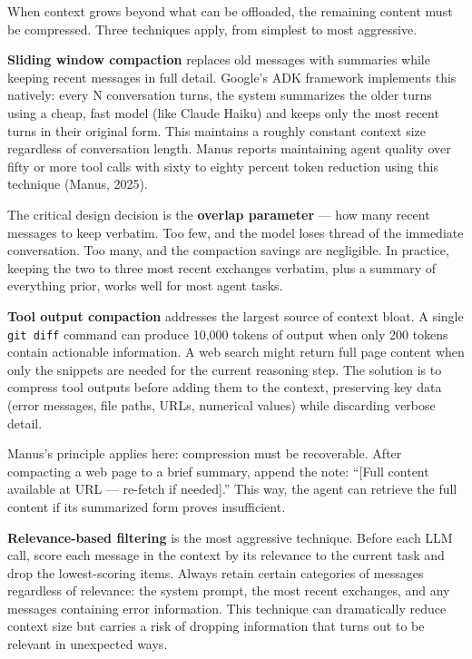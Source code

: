 \documentclass[11pt, a4paper]{article}
\newcommand{\passthrough}[1]{#1}
\begin{document}
When context grows beyond what can be offloaded, the remaining content
must be compressed. Three techniques apply, from simplest to most
aggressive.

\textbf{Sliding window compaction} replaces old messages with summaries
while keeping recent messages in full detail. Google's ADK framework
implements this natively: every N conversation turns, the system
summarizes the older turns using a cheap, fast model (like Claude Haiku)
and keeps only the most recent turns in their original form. This
maintains a roughly constant context size regardless of conversation
length. Manus reports maintaining agent quality over fifty or more tool
calls with sixty to eighty percent token reduction using this technique
(Manus, 2025).

The critical design decision is the \textbf{overlap parameter} --- how
many recent messages to keep verbatim. Too few, and the model loses
thread of the immediate conversation. Too many, and the compaction
savings are negligible. In practice, keeping the two to three most
recent exchanges verbatim, plus a summary of everything prior, works
well for most agent tasks.

\textbf{Tool output compaction} addresses the largest source of context
bloat. A single \passthrough{\lstinline!git diff!} command can produce
10,000 tokens of output when only 200 tokens contain actionable
information. A web search might return full page content when only the
snippets are needed for the current reasoning step. The solution is to
compress tool outputs before adding them to the context, preserving key
data (error messages, file paths, URLs, numerical values) while
discarding verbose detail.

Manus's principle applies here: compression must be recoverable. After
compacting a web page to a brief summary, append the note: ``{[}Full
content available at URL --- re-fetch if needed{]}.'' This way, the
agent can retrieve the full content if its summarized form proves
insufficient.

\textbf{Relevance-based filtering} is the most aggressive technique.
Before each LLM call, score each message in the context by its relevance
to the current task and drop the lowest-scoring items. Always retain
certain categories of messages regardless of relevance: the system
prompt, the most recent exchanges, and any messages containing error
information. This technique can dramatically reduce context size but
carries a risk of dropping information that turns out to be relevant in
unexpected ways.
\end{document}
